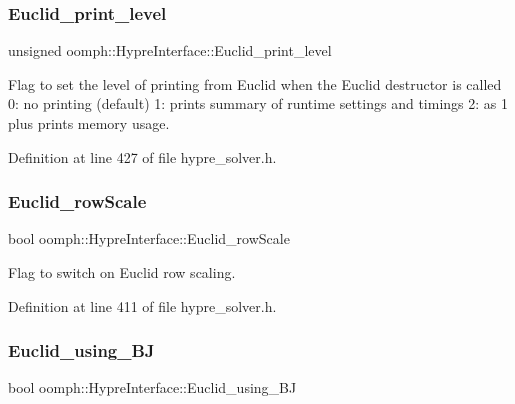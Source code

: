 \subsubsection{\texorpdfstring{Euclid\+\_\+print\+\_\+level}{Euclid\_print\_level}}
{\footnotesize\ttfamily unsigned oomph\+::\+Hypre\+Interface\+::\+Euclid\+\_\+print\+\_\+level\hspace{0.3cm}{\ttfamily [protected]}}



Flag to set the level of printing from Euclid when the Euclid destructor is called 0\+: no printing (default) 1\+: prints summary of runtime settings and timings 2\+: as 1 plus prints memory usage. 



Definition at line 427 of file hypre\+\_\+solver.\+h.

\mbox{\label{classoomph_1_1HypreInterface_a16a2f90a3e7fcdb2909d400d82b90286}} 
\subsubsection{\texorpdfstring{Euclid\+\_\+row\+Scale}{Euclid\_rowScale}}
{\footnotesize\ttfamily bool oomph\+::\+Hypre\+Interface\+::\+Euclid\+\_\+row\+Scale\hspace{0.3cm}{\ttfamily [protected]}}



Flag to switch on Euclid row scaling. 



Definition at line 411 of file hypre\+\_\+solver.\+h.

\mbox{\label{classoomph_1_1HypreInterface_a1405f23d6ffdf4afe2839434a3f738e0}} 
\subsubsection{\texorpdfstring{Euclid\+\_\+using\+\_\+\+BJ}{Euclid\_using\_BJ}}
{\footnotesize\ttfamily bool oomph\+::\+Hypre\+Interface\+::\+Euclid\+\_\+using\+\_\+\+BJ\hspace{0.3cm}{\ttfamily [protected]}}



